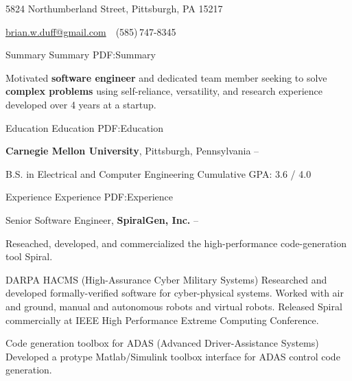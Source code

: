 \documentclass[letterpaper,MMMyyyy,nonstopmode]{simpleresumecv}
\newcommand{\CVAuthor}{Brian W. Duff}
\begin{document}

\Title{\CVAuthor}

\begin{SubTitle}
5824 Northumberland Street, Pittsburgh, PA 15217
\par
\href{mailto:brian.w.duff@gmail.com}
{brian.w.duff@gmail.com}
\,\SubBulletSymbol\,
(585)\,747-8345
\end{SubTitle}

\begin{Body}


\Section
{Summary}
{Summary}
{PDF:Summary}

\Entry
Motivated \textbf{software engineer} and dedicated team member seeking to solve \textbf{complex problems} using self-reliance, versatility, and research experience developed over 4 years at a startup. 



\Section
{Education}
{Education}
{PDF:Education}

\Entry
\textbf{Carnegie Mellon University},
Pittsburgh, Pennsylvania
\hfill
{} --


\Gap
\BulletItem
B.S. in
Electrical and Computer Engineering
\SubBulletItem
Cumulative GPA: 3.6 / 4.0




\Section
{Experience}
{Experience}
{PDF:Experience}

\Entry
Senior Software Engineer,
\textbf{SpiralGen, Inc.}
\hfill
{} --

\BigGap
Reseached, developed, and commercialized the high-performance code-generation tool Spiral.

\BigGap

\BulletItem
DARPA HACMS (High-Assurance Cyber Military Systems)
\SubBulletItem
Researched and developed formally-verified software for cyber-physical systems.
\SubBulletItem
Worked with air and ground, manual and autonomous robots and virtual robots.
\SubBulletItem
Released Spiral commercially at IEEE High Performance Extreme Computing Conference.

\BulletItem
Code generation toolbox for ADAS (Advanced Driver-Assistance Systems)
\SubBulletItem
Developed a protype Matlab/Simulink toolbox interface for ADAS control code generation.


\end{Body}
\end{document}
